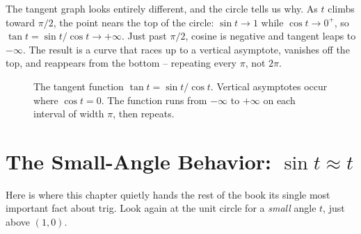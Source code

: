 The tangent graph looks entirely different, and the circle tells us why. As $t$ climbs toward $\pi/2$, the point nears the top of the circle: $\sin t \to 1$ while $\cos t \to 0^+$, so $\tan t = \sin t/\cos t \to +\infty$. Just past $\pi/2$, cosine is negative and tangent leaps to $-\infty$. The result is a curve that races up to a vertical asymptote, vanishes off the top, and reappears from the bottom -- repeating every $\pi$, not $2\pi$.

\begin{figure}[H]
\centering
{}
\caption{The tangent function $\tan t = \sin t/\cos t$. Vertical asymptotes occur where $\cos t = 0$. The function runs from $-\infty$ to $+\infty$ on each interval of width $\pi$, then repeats.}
\label{ch04:fig-tan-graph}
\end{figure}

\section{The Small-Angle Behavior: $\sin t \approx t$}
\label{ch04:smallangle}

Here is where this chapter quietly hands the rest of the book its single most important fact about trig. Look again at the unit circle for a \emph{small} angle $t$, just above $(1,0)$.

